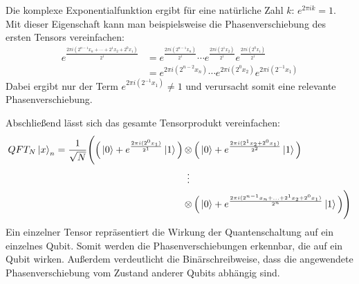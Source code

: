 Die komplexe Exponentialfunktion ergibt für eine natürliche Zahl \(k\): \(e^{2\pi i k} = 1\).
Mit dieser Eigenschaft kann man beispielsweise die Phasenverschiebung des ersten Tensors vereinfachen:
\begin{align*} 
  e^{\frac{2 \pi i (2^{n-1}x_n+ \dotsb +2^1x_2+2^0x_1)}{2^1}}
  &=
  e^{\frac{2 \pi i (2^{n-1}x_n)}{2^1}} \dotsb e^{\frac{2 \pi i (2^1x_2)}{2^1}} e^{\frac{2 \pi i (2^0x_1)}{2^1}} \\
  &=
  e^{{2 \pi i (2^{n-2}x_n)}} \dotsb e^{{2 \pi i (2^0x_2)}} e^{{2 \pi i (2^{-1}x_1)}}
\end{align*}
Dabei ergibt nur der Term \(e^{{2 \pi i (2^{-1}x_1)}} \neq 1 \)  
und verursacht somit eine relevante Phasenverschiebung.

Abschließend lässt sich das gesamte Tensorprodukt vereinfachen:
\begin{align*}
  QFT_{N}\ket{x}_{n} = 
  \frac{1}{\sqrt{N}}
  \Bigg(
    \Big(\ket{0} + { e^{\frac{2 \pi i (2^0x_1)}{2^1}}}\ket{1}\Big) 
    &\tensor
    \Big( \ket{0} + { e^{\frac{2 \pi i (2^1x_2+2^0x_1)}{2^2}}}\ket{1}\Big) \\
    &\vdotswithin{\tensor}\\
    &\tensor
    \Big( \ket{0} + { e^{\frac{2 \pi i (2^{n-1}x_n+ ... +2^1x_2+2^0x_1)}{2^n}}}\ket{1}\Big)
  \Bigg)
\end{align*}
Ein einzelner Tensor repräsentiert die Wirkung der Quantenschaltung auf ein einzelnes Qubit. 
Somit werden die Phasenverschiebungen erkennbar, 
die auf ein Qubit wirken. 
Außerdem verdeutlicht die Binärschreibweise, 
dass die angewendete Phasenverschiebung vom Zustand anderer Qubits abhängig sind.

